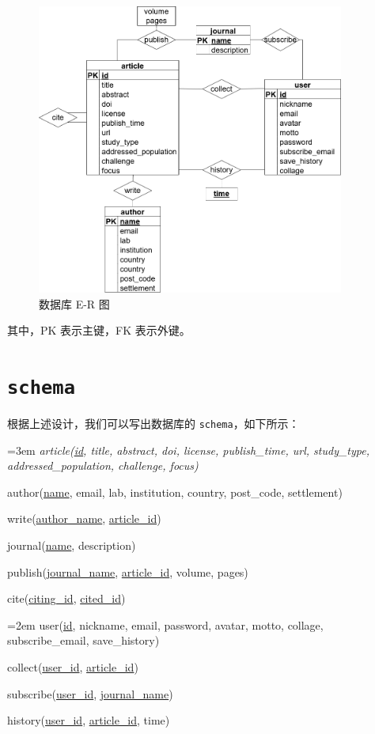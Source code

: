 \documentclass[UTF8,openany]{ctexbook}
\begin{document}
\begin{figure}[H]
    \centering
    \includegraphics[width=0.9\textwidth]{img/ER.png}
    \caption{数据库 E-R 图}
    \label{fig:er}
\end{figure}

其中，PK 表示主键，FK 表示外键。

\section{\texttt{schema}}

根据上述设计，我们可以写出数据库的 \texttt{schema}，如下所示：

\begin{tcolorbox}
    \raggedright
    \hangindent=3em
    \it
    article(\uline{id}, title, abstract, doi, license, publish\_time, url, study\_type, addressed\_population,
    challenge, focus)

    author(\uline{name}, email, lab, institution, country, post\_code, settlement)

    write(\uline{author\_name}, \uline{article\_id})

    journal(\uline{name}, description)

    publish(\uline{journal\_name}, \uline{article\_id}, volume, pages)

    cite(\uline{citing\_id}, \uline{cited\_id})

    \hangindent=2em
    user(\uline{id}, nickname, email, password, avatar, motto, collage, subscribe\_email, save\_history)

    collect(\uline{user\_id}, \uline{article\_id})

    subscribe(\uline{user\_id}, \uline{journal\_name})

    history(\uline{user\_id}, \uline{article\_id}, time)
\end{tcolorbox}
\end{document}
